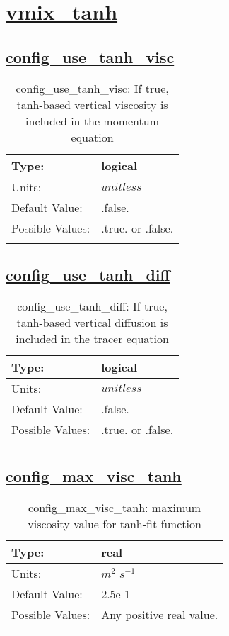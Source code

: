 \section[vmix\_tanh]{\hyperref[sec:nm_tab_vmix_tanh]{vmix\_tanh}}
\label{sec:nm_sec_vmix_tanh}
\subsection[config\_use\_tanh\_visc]{\hyperref[sec:nm_tab_vmix_tanh]{config\_use\_tanh\_visc}}
\label{subsec:nm_sec_config_use_tanh_visc}
\begin{center}
\begin{longtable}{| p{2.0in} | p{4.0in} |}
    \hline
    Type: & logical \\
    \hline
    Units: & $unitless$ \\
    \hline
    Default Value: & .false. \\
    \hline
    Possible Values: & .true. or .false. \\
    \hline
    \caption{config\_use\_tanh\_visc: If true, tanh-based vertical viscosity is included in the momentum equation}
\end{longtable}
\end{center}
\subsection[config\_use\_tanh\_diff]{\hyperref[sec:nm_tab_vmix_tanh]{config\_use\_tanh\_diff}}
\label{subsec:nm_sec_config_use_tanh_diff}
\begin{center}
\begin{longtable}{| p{2.0in} | p{4.0in} |}
    \hline
    Type: & logical \\
    \hline
    Units: & $unitless$ \\
    \hline
    Default Value: & .false. \\
    \hline
    Possible Values: & .true. or .false. \\
    \hline
    \caption{config\_use\_tanh\_diff: If true, tanh-based vertical diffusion is included in the tracer equation}
\end{longtable}
\end{center}
\subsection[config\_max\_visc\_tanh]{\hyperref[sec:nm_tab_vmix_tanh]{config\_max\_visc\_tanh}}
\label{subsec:nm_sec_config_max_visc_tanh}
\begin{center}
\begin{longtable}{| p{2.0in} | p{4.0in} |}
    \hline
    Type: & real \\
    \hline
    Units: & $m^2$ $s^{-1}$ \\
    \hline
    Default Value: & 2.5e-1 \\
    \hline
    Possible Values: & Any positive real value. \\
    \hline
    \caption{config\_max\_visc\_tanh: maximum viscosity value for tanh-fit function}
\end{longtable}
\end{center}
